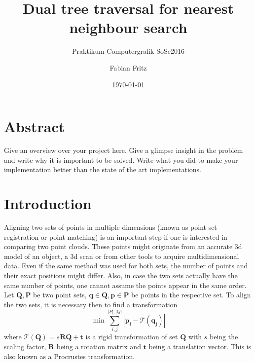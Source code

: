 \documentclass{utue} %
\title{Dual tree traversal for nearest neighbour search}
\author{Fabian Fritz}
\date{\today}
\subtitle{Praktikum Computergrafik SoSe2016}
\begin{document}

\maketitle

\section*{Abstract}

Give an overview over your project here. Give a glimpse insight in the problem and write why it is important to be solved. Write what you did to make your implementation better than the state of the art implementations.


\section{Introduction}

Aligning two sets of points in multiple dimensions (known as point set registration or point matching) is an important step if one is interested in comparing two point clouds.
These points might originate from an accurate 3d model of an object, a 3d scan or from other tools to acquire multidimensional data. Even if the same method was used for both sets, the number of points and their exact positions might differ. Also, in case the two sets actually have the same number of points, one cannot assume the points appear in the same order. Let $\mathbf{Q},\mathbf{P}$ be two point sets, $\mathbf{q} \in \mathbf{Q}, \mathbf{p} \in \mathbf{P}$ be points in the respective set. To align the two sets, it is necessary then to find a transformation$$
\min \sum_{i,j}^{|P|,|Q|} |\mathbf{p_i}-\mathcal{T}(\mathbf{q_j})|
$$
where $\mathcal{T}(\mathbf{Q}) = s\mathbf{R}\mathbf{Q} + \mathbf{t}$ is a rigid transformation of set $\mathbf{Q}$ with $s$ being the scaling factor, $\mathbf{R}$ being a rotation matrix and $\mathbf{t}$ being a translation vector. This is also known as a Procrustes transformation.
\end{document}
